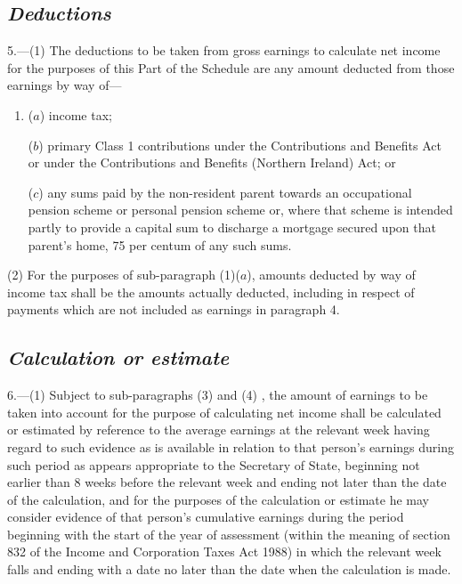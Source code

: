 \documentclass[12pt,a4paper]{article}
\begin{document}
\subsection*{\itshape Deductions}

5.---(1)  The deductions to be taken from gross earnings to calculate net income for the purposes of this Part of the Schedule are any amount deducted from those earnings by way of—
\begin{enumerate}\item[]
($a$) income tax;

($b$) primary Class 1 contributions under the Contributions and Benefits Act or under the Contributions and Benefits (Northern Ireland) Act; or

($c$) any sums paid by the non-resident parent towards an occupational pension scheme or personal pension scheme or, where that scheme is intended partly to provide a capital sum to discharge a mortgage secured upon that parent’s home, 75 per centum of any such sums.
\end{enumerate}

(2) For the purposes of sub-paragraph (1)($a$), amounts deducted by way of income tax shall be the amounts actually deducted, including in respect of payments which are not included as earnings in paragraph 4.

\subsection*{\itshape Calculation or estimate}

6.---(1)  Subject to 
sub-paragraphs (3) and (4)%
, the amount of earnings to be taken into account for the purpose of calculating net income shall be calculated or estimated by reference to the average earnings at the relevant week having regard to such evidence as is available in relation to that person’s earnings during such period as appears appropriate to the Secretary of State, beginning not earlier than 8 weeks before the relevant week and ending not later than the date of the calculation, and for the purposes of the calculation or estimate he may consider evidence of that person’s cumulative earnings during the period beginning with the start of the year of assessment (within the meaning of section 832 of the Income and Corporation Taxes Act 1988) in which the relevant week falls and ending with a date no later than the date when the calculation is made.
\end{document}
